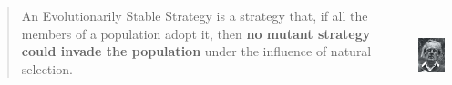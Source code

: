 \documentclass[compress]{beamer}
\begin{document}

\begin{frame}{\cite{maynard-smith-price:1973}}
\begin{columns}[T]  
   \begin{column}{.75\textwidth}
      \begin{block}{}
	\begin{quote}
	     An Evolutionarily Stable Strategy is a strategy that, if all the members of a population adopt it, then \textbf{no mutant strategy could invade the population} under the influence of natural selection.
	\end{quote}  
      \end{block}
    \end{column}
    \begin{column}{.2\textwidth}
	  \vspace{12pt}
	  \includegraphics[height=1.1in]{maynard.jpg}   
     \end{column}
  \end{columns}
\end{frame}
\end{document}
